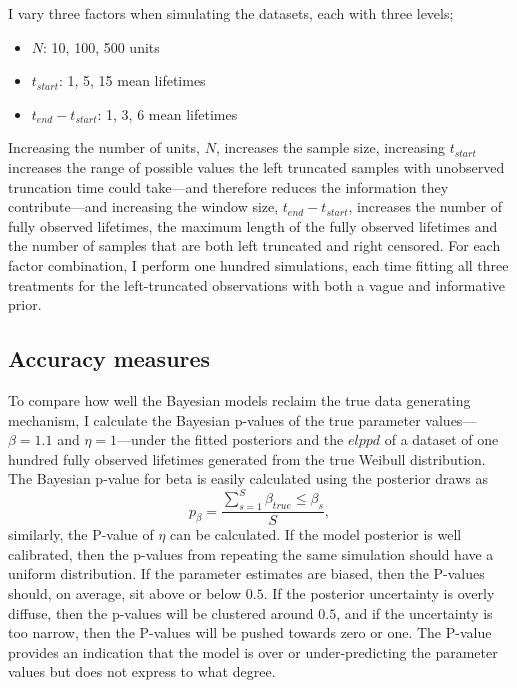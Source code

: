 I vary three factors when simulating the datasets, each with three levels;
\begin{itemize}
    \item $N$: 10, 100, 500 units
    \item $t_{start}$: 1, 5, 15 mean lifetimes
    \item $t_{end} - t_{start}$: 1, 3, 6 mean lifetimes
\end{itemize}
Increasing the number of units, $N$, increases the sample size, increasing $t_{start}$ increases the range of possible values the left truncated samples with unobserved truncation time could take---and therefore reduces the information they contribute---and increasing the window size, $t_{end} - t_{start}$, increases the number of fully observed lifetimes, the maximum length of the fully observed lifetimes and the number of samples that are both left truncated and right censored. For each factor combination, I perform one hundred simulations, each time fitting all three treatments for the left-truncated observations with both a vague and informative prior.

\subsection{Accuracy measures}

To compare how well the Bayesian models reclaim the true data generating mechanism, I calculate the Bayesian p-values of the true parameter values---$\beta = 1.1$ and $\eta = 1$---under the fitted posteriors and the $elppd$ of a dataset of one hundred fully observed lifetimes generated from the true Weibull distribution. The Bayesian p-value for beta is easily calculated using the posterior draws as
\begin{equation*}
    p_{\beta} = \frac{\sum^{S}_{s = 1}{\beta_{true} \le \beta_s}}{S},
\end{equation*}
similarly, the P-value of $\eta$ can be calculated. If the model posterior is well calibrated, then the p-values from repeating the same simulation should have a uniform distribution. If the parameter estimates are biased, then the P-values should, on average, sit above or below $0.5$. If the posterior uncertainty is overly diffuse, then the p-values will be clustered around $0.5$, and if the uncertainty is too narrow, then the P-values will be pushed towards zero or one. The P-value provides an indication that the model is over or under-predicting the parameter values but does not express to what degree.

